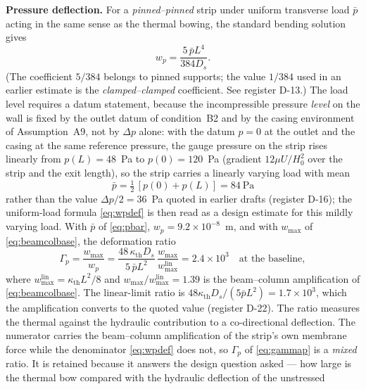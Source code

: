 \textbf{Pressure deflection.} For a \emph{pinned--pinned} strip under uniform transverse load
$\bar p$ acting in the same sense as the thermal bowing, the standard bending solution
\cite{timoshenko1961stability,timoshenko1970elasticity} gives
\begin{equation}
w_p=\frac{5\,\bar p L^4}{384D_s}.
\label{eq:wpdef}
\end{equation}
(The coefficient $5/384$ belongs to pinned supports; the value $1/384$ used in an earlier estimate
is the \emph{clamped--clamped} coefficient. See register D-13.) The load level requires a datum
statement, because the incompressible pressure \emph{level} on the wall is fixed by the outlet
datum of condition~B2 and by the casing environment of Assumption~A9, not by $\Delta p$ alone:
with the datum $p=0$ at the outlet and the casing at the same reference pressure, the gauge
pressure on the strip rises linearly from $p(L)=48$~Pa to $p(0)=120$~Pa (gradient
$12\mu U/H_0^2$ over the strip and the exit length), so the strip carries a linearly varying load
with mean
\begin{equation}
\bar p=\tfrac{1}{2}\,[p(0)+p(L)] = 84~\mathrm{Pa}
\label{eq:pbar}
\end{equation}
rather than the value $\Delta p/2=36$~Pa quoted in earlier drafts (register D-16); the
uniform-load formula \eqref{eq:wpdef} is then read as a design estimate for this mildly varying
load. With $\bar p$ of \eqref{eq:pbar}, $w_p=9.2\times10^{-8}$~m, and with $w_{\max}$ of
\eqref{eq:beamcolbase}, the deformation ratio
\begin{equation}
\Gamma_p=\frac{w_{\max}}{w_p}
=\frac{48\,\kappa_{\mathrm{th}}D_s}{5\,\bar p L^2}\,\frac{w_{\max}}{w_{\max}^{\mathrm{lin}}}
=2.4\times10^{3}\quad\text{at the baseline},
\label{eq:gammap}
\end{equation}
where $w_{\max}^{\mathrm{lin}}=\kappa_{\mathrm{th}}L^2/8$ and
$w_{\max}/w_{\max}^{\mathrm{lin}}=1.39$ is the beam--column amplification of
\eqref{eq:beamcolbase}. The linear-limit ratio is
$48\kappa_{\mathrm{th}}D_s/(5\bar pL^2)=1.7\times10^{3}$, which the amplification converts to the
quoted value (register D-22). The ratio measures the thermal against the hydraulic contribution to a
co-directional deflection. The numerator carries the beam--column amplification of the strip's own
membrane force while the denominator \eqref{eq:wpdef} does not, so $\Gamma_p$ of
\eqref{eq:gammap} is a \emph{mixed} ratio. It is retained because it answers the design question
asked --- how large is the thermal bow compared with the hydraulic deflection of the unstressed
